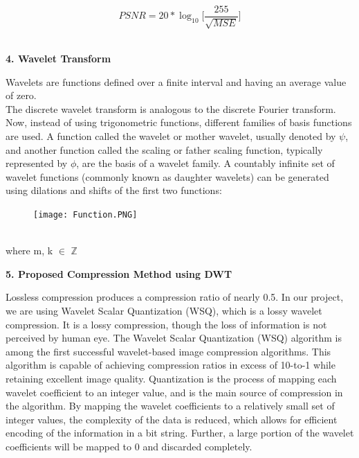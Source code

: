 \documentclass{article}
\begin{document}
\[PSNR = 20 * \log_{10}{[\frac{255}{\sqrt{MSE}}}]\]\\

\begin{flushleft}
\textbf{\large 4. Wavelet Transform}
\end{flushleft}

Wavelets are functions defined over a finite interval and having an average value of zero.\\
The discrete wavelet transform is analogous to the discrete Fourier transform. Now, instead of using trigonometric functions, different families of basis functions are used. A function called the wavelet or mother wavelet, usually denoted by $\psi$, and another function called the scaling or father scaling function, typically represented by $\phi$, are the basis of a wavelet family. A countably infinite set of wavelet functions (commonly known as daughter wavelets) can be generated using dilations and shifts of the first two functions:
\begin{figure}[htp]
    \centering
    \Large\texttt{[image: Function.PNG]}
    \label{fig:Function}
\end{figure}\\
where m, k $\in$ $\mathbb{Z}$\\

\begin{flushleft}
\textbf{\large 5. Proposed Compression Method using DWT}
\end{flushleft}

Lossless compression produces a compression ratio of nearly 0.5. In our project, we are using Wavelet Scalar Quantization (WSQ), which is a lossy wavelet compression. It is a lossy compression, though the loss of information is not perceived by human eye.
The Wavelet Scalar Quantization (WSQ) algorithm is among the first successful wavelet-based image compression algorithms. This algorithm is capable of achieving compression ratios in excess of 10-to-1 while retaining excellent image quality. 
Quantization is the process of mapping each wavelet coefficient to an integer value, and is the main source of compression in the algorithm. By mapping the wavelet coefficients to a relatively small set of integer values, the complexity of the data is reduced, which allows for efficient encoding of the information in a bit string. Further, a large portion of the wavelet coefficients will be mapped to 0 and discarded completely.\\
\end{document}
